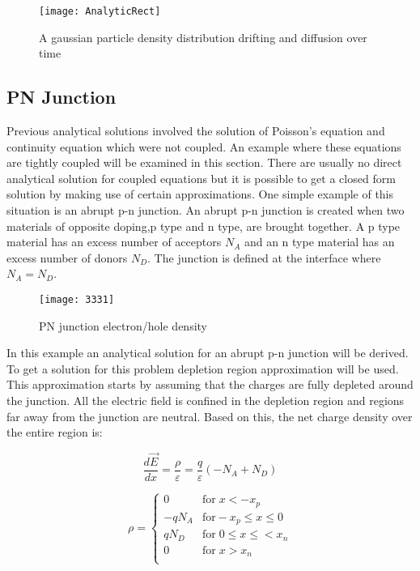 \begin{doublespace}
\begin{figure}[!htp]
\centering
\texttt{[image: AnalyticRect]}
\caption{A gaussian particle density distribution drifting and diffusion over time} 
\end{figure}
\clearpage
\subsection{PN Junction}
Previous analytical solutions involved the solution of Poisson's equation and continuity equation which were not coupled. An example where these equations are tightly coupled will be examined in this section. There are usually no direct analytical solution for coupled equations but it is possible to get a closed form solution by making use of certain approximations. One simple example of this situation is an abrupt p-n junction. An abrupt p-n junction is created when two materials of opposite doping,p type and n type, are brought together. A p type material has an excess number of acceptors $N_A$ and an n type material has an excess number of donors $N_D$. The junction is defined at the interface where $N_A=N_D$. 

\begin{figure}[!htp]
\centering
\texttt{[image: 3331]}
\caption{PN junction electron/hole density} 
\end{figure}

In this example an analytical solution for an abrupt p-n junction will be derived. To get a solution for this problem depletion region approximation will be used. This approximation starts by assuming that the charges are fully depleted around the junction. All the electric field is confined in the depletion region and regions far away from the junction are neutral. Based on this, the net charge density over the entire region is:

\begin{equation}
\frac{d \vec{E} }{dx}=\frac{\rho}{\varepsilon}=\frac{q}{\varepsilon}(-N_{A}+N_{D})
\end{equation}

\begin{equation}
\rho = \begin{cases}
         0 & \text{for} \;  x<-x_{p}\\
       -qN_{A} & \text{for}  -x_{p}\leq x \leq 0 \\
        qN_{D} & \text{for} \; 0 \leq x \leq< x_{n}  \\
        0 & \text{for}\;  x>x_{n} \\
     \end{cases}
\end{equation}


\end{doublespace}
